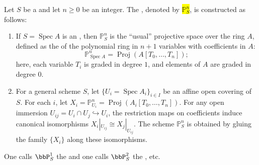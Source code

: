 \begin{definition} \label{definition:projective_space_of_dimension_n_over_a_scheme}
Let $S$ be a  and let $n \geq 0$ be an integer. The , denoted by \hl{$\mathbb{P}^n_S$}, is constructed as follows:

\begin{enumerate}
    \item If $S = \operatorname{Spec} A$ is an , then $\mathbb{P}^n_S$ is the ``usual'' projective space over the ring $A$, defined as the  of the polynomial ring in $n+1$ variables with coefficients in $A$:
    $$\mathbb{P}^n_{\operatorname{Spec} A} = \operatorname{Proj}(A[T_0, \dots, T_n]);$$
    here, each variable $T_i$ is graded in degree $1$, and elements of $A$ are graded in degree $0$.
    \item For a general scheme $S$, let $\{U_i = \operatorname{Spec} A_i\}_{i \in I}$ be an affine open covering of $S$. For each $i$, let $X_i = \mathbb{P}^n_{U_i} = \operatorname{Proj}(A_i[T_0, \dots, T_n])$. For any open immersion $U_{ij} = U_i \cap U_j \hookrightarrow U_i$, the restriction maps on coefficients induce canonical isomorphisms $X_i|_{U_{ij}} \cong X_j|_{U_{ij}}$. The scheme $\mathbb{P}^n_S$ is obtained by gluing the family $\{X_i\}$ along these isomorphisms.
\end{enumerate}

One calls $\bbP^1_S$ the  and one calls $\bbP^2_S$ the , etc.

\end{definition}